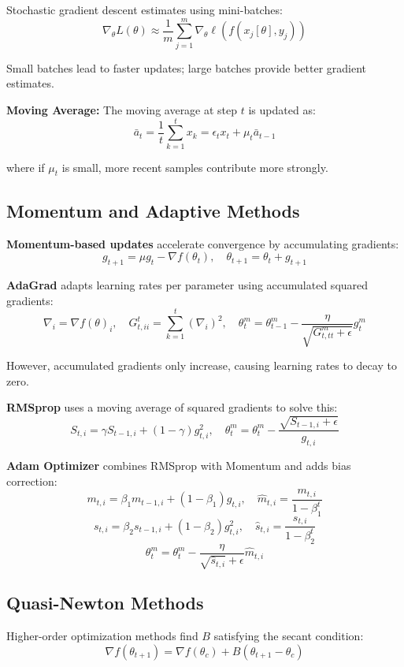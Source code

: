 \documentclass[12pt,a4paper]{article}
\theoremstyle{definition}
\begin{document}
Stochastic gradient descent estimates using mini-batches:
\[
\nabla_\theta L(\theta) \approx \frac{1}{m} \sum_{j=1}^m \nabla_\theta \ell(f(x_j[\theta], y_j))
\]

Small batches lead to faster updates; large batches provide better gradient estimates.

\vspace{0.3cm}
\noindent\textbf{Moving Average:} The moving average at step $t$ is updated as:
\[
\bar{a}_t = \frac{1}{t} \sum_{k=1}^t x_k = \epsilon_t x_t + \mu_t \bar{a}_{t-1}
\]

where if $\mu_t$ is small, more recent samples contribute more strongly.

\subsection{Momentum and Adaptive Methods}

\textbf{Momentum-based updates} accelerate convergence by accumulating gradients:
\[
g_{t+1} = \mu g_t - \nabla f(\theta_t), \quad \theta_{t+1} = \theta_t + g_{t+1}
\]

\textbf{AdaGrad} adapts learning rates per parameter using accumulated squared gradients:
\[
\nabla_i = \nabla f(\theta)_i, \quad G_{t, ii}^t = \sum_{k=1}^t (\nabla_i)^2, \quad \theta_t^m = \theta_{t-1}^m - \frac{\eta}{\sqrt{G_{t,tt}^m + \epsilon}} g_t^m
\]

However, accumulated gradients only increase, causing learning rates to decay to zero.

\textbf{RMSprop} uses a moving average of squared gradients to solve this:
\[
S_{t,i} = \gamma S_{t-1,i} + (1-\gamma) g_{t,i}^2, \quad \theta_t^m = \theta_t^m - \frac{\sqrt{S_{t-1,i} + \epsilon}}{g_{t,i}}
\]

\textbf{Adam Optimizer} combines RMSprop with Momentum and adds bias correction:
\[
m_{t,i} = \beta_1 m_{t-1,i} + (1-\beta_1) g_{t,i}, \quad \hat{m}_{t,i} = \frac{m_{t,i}}{1-\beta_1^t}
\]
\[
s_{t,i} = \beta_2 s_{t-1,i} + (1-\beta_2) g_{t,i}^2, \quad \hat{s}_{t,i} = \frac{s_{t,i}}{1-\beta_2^t}
\]
\[
\theta_t^m = \theta_t^m - \frac{\eta}{\sqrt{\hat{s}_{t,i}} + \epsilon} \hat{m}_{t,i}
\]

\subsection{Quasi-Newton Methods}

Higher-order optimization methods find $B$ satisfying the secant condition:
\[
\nabla f(\theta_{t+1}) = \nabla f(\theta_c) + B(\theta_{t+1} - \theta_c)
\]
\end{document}
